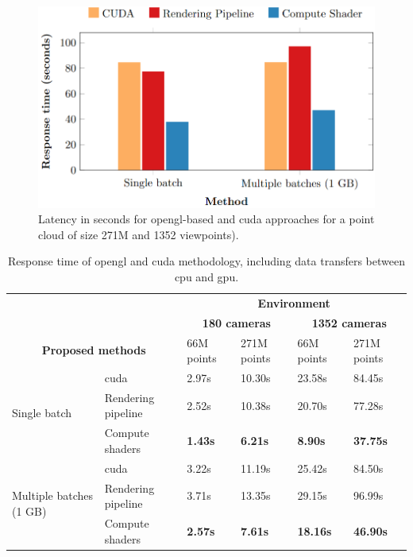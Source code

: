 \begin{figure}[ht]
    \includegraphics[width=.9\linewidth]{figs/multi_thermal_projection/results/response_time_cuda_opengl.png}
    \caption{Latency in seconds for \acrshort{opengl}-based and \acrshort{cuda} approaches for a point cloud of size 271M and 1352 viewpoints).}
    \label{fig:cuda_opengl_occlusion_response_time}
\end{figure}

\renewcommand{\arraystretch}{1.2}
\begin{table}[htb]
\centering
\caption{Response time of \acrshort{opengl} and \acrshort{cuda} methodology, including data transfers between \acrshort{cpu} and \acrshort{gpu}.}
\label{table:cuda_opengl_occlusion_response_time}
\begin{tabular}{llllll}
    \toprule
    \multicolumn{2}{c}{} & \multicolumn{4}{c}{\textbf{Environment}} \\
    \cmidrule{3-6}
    \multicolumn{2}{c}{} & \multicolumn{2}{c}{\textbf{180 cameras}} & \multicolumn{2}{c}{\textbf{1352 cameras}}\\
    \cmidrule{3-6}
    \multicolumn{2}{c}{\textbf{Proposed methods}} & 66M points & 271M points & 66M points & 271M points\\
    \midrule
    \multirow{3}{*}{Single batch} & \acrshort{cuda} & 2.97s & 10.30s & 23.58s & 84.45s\\
    & Rendering pipeline & 2.52s & 10.38s & 20.70s & 77.28s\\
    & Compute shaders & \textbf{1.43s} & \textbf{6.21s} & \textbf{8.90s} & \textbf{37.75s}\\
    \hline
    \multirow{3}{*}{Multiple batches (1 GB)} & \acrshort{cuda} & 3.22s & 11.19s & 25.42s & 84.50s\\
    & Rendering pipeline & 3.71s & 13.35s & 29.15s & 96.99s\\
    & Compute shaders & \textbf{2.57s} & \textbf{7.61s} & \textbf{18.16s} & \textbf{46.90s}\\
    \bottomrule
\end{tabular}
\end{table}
\renewcommand{\arraystretch}{1}

